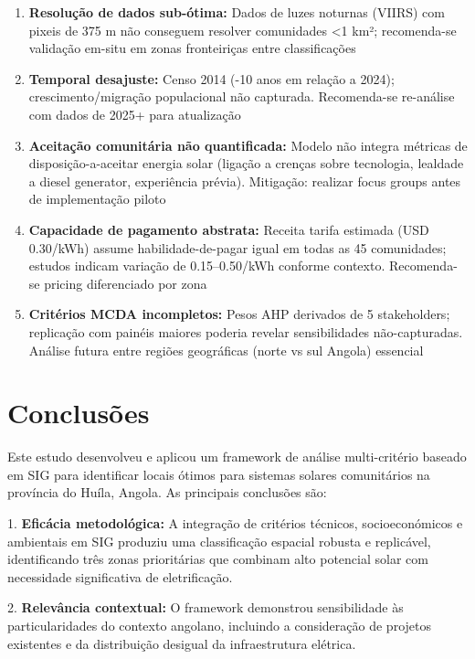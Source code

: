 \documentclass[12pt, a4paper]{article}
\begin{document}
\begin{enumerate}
    \item \textbf{Resolução de dados sub-ótima:} Dados de luzes noturnas (VIIRS) com pixeis de 375 m não conseguem resolver comunidades <1 km²; recomenda-se validação em-situ em zonas fronteiriças entre classificações
    
    \item \textbf{Temporal desajuste:} Censo 2014 (-10 anos em relação a 2024); crescimento/migração populacional não capturada. Recomenda-se re-análise com dados de 2025+ para atualização
    
    \item \textbf{Aceitação comunitária não quantificada:} Modelo não integra métricas de disposição-a-aceitar energia solar (ligação a crenças sobre tecnologia, lealdade a diesel generator, experiência prévia). Mitigação: realizar focus groups antes de implementação piloto
    
    \item \textbf{Capacidade de pagamento abstrata:} Receita tarifa estimada (USD 0.30/kWh) assume habilidade-de-pagar igual em todas as 45 comunidades; estudos indicam variação de 0.15–0.50/kWh conforme contexto. Recomenda-se pricing diferenciado por zona
    
    \item \textbf{Critérios MCDA incompletos:} Pesos AHP derivados de 5 stakeholders; replicação com painéis maiores poderia revelar sensibilidades não-capturadas. Análise futura entre regiões geográficas (norte vs sul Angola) essencial
\end{enumerate}

\section{Conclusões}

Este estudo desenvolveu e aplicou um framework de análise multi-critério baseado em SIG para identificar locais ótimos para sistemas solares comunitários na província do Huíla, Angola. As principais conclusões são:

1. \textbf{Eficácia metodológica:} A integração de critérios técnicos, socioeconómicos e ambientais em SIG produziu uma classificação espacial robusta e replicável, identificando três zonas prioritárias que combinam alto potencial solar com necessidade significativa de eletrificação.

2. \textbf{Relevância contextual:} O framework demonstrou sensibilidade às particularidades do contexto angolano, incluindo a consideração de projetos existentes e da distribuição desigual da infraestrutura elétrica.
\end{document}
